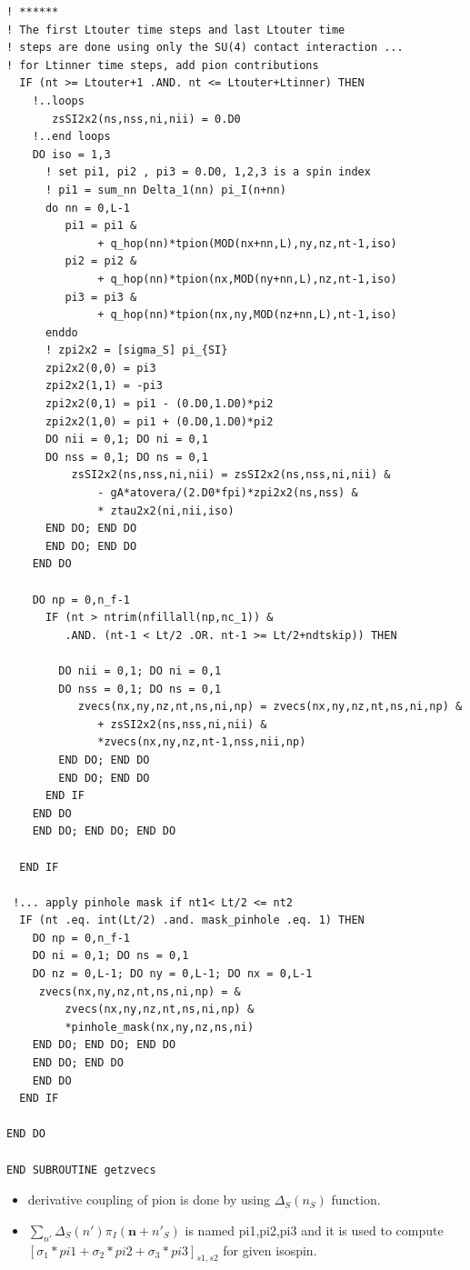 \documentclass[10pt]{book}
\def\bm{\boldsymbol}
\def\vn{{\bm n}}
\begin{document}
\begin{lstlisting}[frame=single]
! ******
! The first Ltouter time steps and last Ltouter time 
! steps are done using only the SU(4) contact interaction ...
! for Ltinner time steps, add pion contributions
  IF (nt >= Ltouter+1 .AND. nt <= Ltouter+Ltinner) THEN
    !..loops
       zsSI2x2(ns,nss,ni,nii) = 0.D0                         
    !..end loops    
    DO iso = 1,3
      ! set pi1, pi2 , pi3 = 0.D0, 1,2,3 is a spin index
      ! pi1 = sum_nn Delta_1(nn) pi_I(n+nn)
      do nn = 0,L-1
         pi1 = pi1 &
              + q_hop(nn)*tpion(MOD(nx+nn,L),ny,nz,nt-1,iso)
         pi2 = pi2 &
              + q_hop(nn)*tpion(nx,MOD(ny+nn,L),nz,nt-1,iso)
         pi3 = pi3 &
              + q_hop(nn)*tpion(nx,ny,MOD(nz+nn,L),nt-1,iso)
      enddo
      ! zpi2x2 = [sigma_S] pi_{SI}
      zpi2x2(0,0) = pi3
      zpi2x2(1,1) = -pi3
      zpi2x2(0,1) = pi1 - (0.D0,1.D0)*pi2
      zpi2x2(1,0) = pi1 + (0.D0,1.D0)*pi2
      DO nii = 0,1; DO ni = 0,1
      DO nss = 0,1; DO ns = 0,1
          zsSI2x2(ns,nss,ni,nii) = zsSI2x2(ns,nss,ni,nii) &
              - gA*atovera/(2.D0*fpi)*zpi2x2(ns,nss) &
              * ztau2x2(ni,nii,iso)                          
      END DO; END DO
      END DO; END DO
    END DO
    
    DO np = 0,n_f-1
      IF (nt > ntrim(nfillall(np,nc_1)) &
         .AND. (nt-1 < Lt/2 .OR. nt-1 >= Lt/2+ndtskip)) THEN

        DO nii = 0,1; DO ni = 0,1
        DO nss = 0,1; DO ns = 0,1                                  
           zvecs(nx,ny,nz,nt,ns,ni,np) = zvecs(nx,ny,nz,nt,ns,ni,np) &
              + zsSI2x2(ns,nss,ni,nii) &
              *zvecs(nx,ny,nz,nt-1,nss,nii,np)            
        END DO; END DO
        END DO; END DO      
      END IF
    END DO
    END DO; END DO; END DO  

  END IF

 !... apply pinhole mask if nt1< Lt/2 <= nt2  
  IF (nt .eq. int(Lt/2) .and. mask_pinhole .eq. 1) THEN
    DO np = 0,n_f-1
    DO ni = 0,1; DO ns = 0,1      
    DO nz = 0,L-1; DO ny = 0,L-1; DO nx = 0,L-1                              
     zvecs(nx,ny,nz,nt,ns,ni,np) = &
         zvecs(nx,ny,nz,nt,ns,ni,np) &
         *pinhole_mask(nx,ny,nz,ns,ni)      
    END DO; END DO; END DO
    END DO; END DO
    END DO
  END IF   

END DO

END SUBROUTINE getzvecs
\end{lstlisting} 

\begin{itemize}
	\item derivative coupling of pion is done by using $\Delta_S(n_S)$ function. 
	\item $\sum_{n'} \Delta_S(n')\pi_I(\vn+n'_S)$ is named pi1,pi2,pi3 and it is used to
	     compute $\left[\sigma_1*pi1+\sigma_2*pi2+\sigma_3*pi3\right]_{s1,s2}$
	     for given isospin. 
	
\end{itemize}
\end{document}

